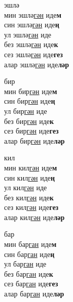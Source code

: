 \begin{multicols}{4}
\begin{enumerate}
\begin{minipage}{\linewidth}
    \item
    эшлә\\
    мин эшлә\underline{гән} иде\textbf{м}\\
    син эшлә\underline{гән} иде\textbf{ң}\\
    ул эшлә\underline{гән} иде\\
    без эшлә\underline{гән} иде\textbf{к}\\
    сез эшлә\underline{гән} иде\textbf{гез}\\
    алар эшлә\underline{гән} иде\textbf{ләр}\\
\end{minipage}

\begin{minipage}{\linewidth}
    \item
    бир\\
    мин бир\underline{гән} иде\textbf{м}\\
    син бир\underline{гән} иде\textbf{ң}\\
    ул бир\underline{гән} иде\\
    без бир\underline{гән} иде\textbf{к}\\
    сез бир\underline{гән} иде\textbf{гез}\\
    алар бир\underline{гән} иде\textbf{ләр}\\
\end{minipage}

\begin{minipage}{\linewidth}
    \item
    кил\\
    мин кил\underline{гән} иде\textbf{м}\\
    син кил\underline{гән} иде\textbf{ң}\\
    ул кил\underline{гән} иде\\
    без кил\underline{гән} иде\textbf{к}\\
    сез кил\underline{гән} иде\textbf{гез}\\
    алар кил\underline{гән} иде\textbf{ләр}\\
\end{minipage}

\begin{minipage}{\linewidth}
    \item
    бар\\
    мин бар\underline{ган} иде\textbf{м}\\
    син бар\underline{ган} иде\textbf{ң}\\
    ул бар\underline{ган} иде\\
    без бар\underline{ган} иде\textbf{к}\\
    сез бар\underline{ган} иде\textbf{гез}\\
    алар бар\underline{ган} иде\textbf{ләр}\\
\end{minipage}


\end{enumerate}
\end{multicols}
